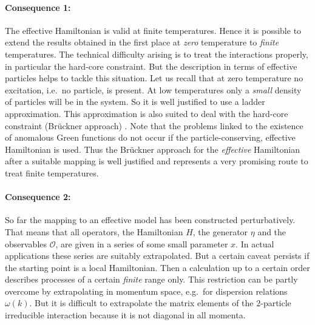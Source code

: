 \paragraph{Consequence 1:}
The effective Hamiltonian is valid at finite temperatures. Hence it is
possible to extend the results obtained in the first place
at {\it zero} temperature to {\it finite} temperatures.
 The technical difficulty arising  is to
treat the interactions properly, in particular the hard-core constraint.
But the description in terms of effective particles helps to
tackle this situation. Let us recall that at zero temperature no excitation,
 i.e.\ no particle, is present.
At low temperatures only a {\it small} density of particles
will be in the system. So it is well justified to use a ladder
approximation. This approximation is also suited to deal with
the hard-core constraint (Br\"uckner approach) \cite{sushk98,kotov99}. 
Note that the problems linked to the existence of anomalous Green functions
\cite{kotov99} do not occur if the particle-conserving, effective 
Hamiltonian is used. Thus the Br\"uckner approach for the {\it effective} 
Hamiltonian after a suitable mapping \cite{trebs00,knett00a}
is well justified and represents a very promising route 
to treat  finite temperatures.

\paragraph{Consequence 2:}
So far the mapping to an effective model has been constructed perturbatively.
That means that all operators, the Hamiltonian $H$, the generator $\eta$
and the observables ${\mathcal O}$, are given in a series of
some small parameter $x$. In actual applications these series are
suitably extrapolated. But a certain caveat persists if the starting
point is a local Hamiltonian. Then a calculation up to a certain order
describes processes of a certain {\it finite} range only. This restriction
can be partly overcome by extrapolating in momentum space, e.g.\
for dispersion relations $\omega(k)$. But it is difficult to
extrapolate the matrix elements of the $2$-particle irreducible interaction 
because it is not diagonal in all momenta.

